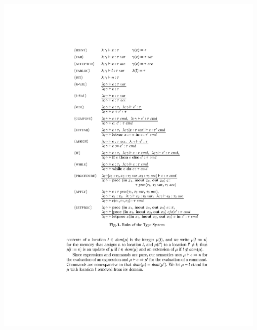 \documentclass{beamer}
\begin{document}
\begin{frame}[fragile]
\begin{center}
\includegraphics[scale=1.2]{figures/typesys1}
\end{center}
\end{frame}
\end{document}
